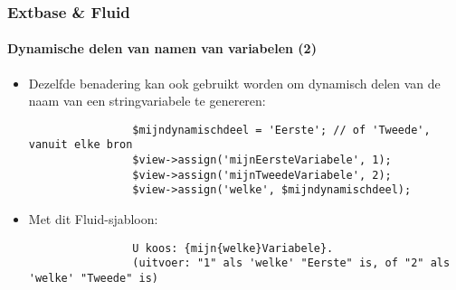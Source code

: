 \begin{frame}[fragile]
	\frametitle{Extbase \& Fluid}
	\framesubtitle{Dynamische delen van namen van variabelen (2)}

	\lstset{basicstyle=\tiny\ttfamily}

	\begin{itemize}

		\item Dezelfde benadering kan ook gebruikt worden om dynamisch delen van de
		 	naam van een stringvariabele te genereren:

			\begin{lstlisting}
				$mijndynamischdeel = 'Eerste'; // of 'Tweede', vanuit elke bron
				$view->assign('mijnEersteVariabele', 1);
				$view->assign('mijnTweedeVariabele', 2);
				$view->assign('welke', $mijndynamischdeel);
			\end{lstlisting}

		\item Met dit Fluid-sjabloon:

			\begin{lstlisting}
				U koos: {mijn{welke}Variabele}.
				(uitvoer: "1" als 'welke' "Eerste" is, of "2" als 'welke' "Tweede" is)
			\end{lstlisting}

	\end{itemize}

\end{frame}


